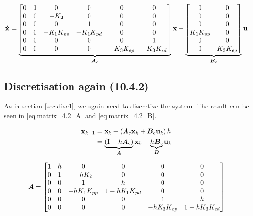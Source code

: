 \begin{equation}\label{eq:matrices}
	\mathbf{\dot{x}} =
	\underbrace{
		\begin{bmatrix}
			0 & 1 & 0				& 0				& 0				& 0				\\
			0 & 0 & -K_{2}			& 0				& 0				& 0				\\
			0 & 0 & 0				& 1				& 0				& 0				\\
			0 & 0 & -K_{1}K_{pp}	& -K_{1}K_{pd}	& 0				& 0				\\
			0 & 0 & 0				& 0 			& 0				& 1				\\
			0 & 0 & 0				& 0				& -K_{3}K_{ep}	& -K_{3}K_{ed}	\\
		\end{bmatrix}
	}_{\bm{A}_{c}}
	\mathbf{x} +
	\underbrace{
		\begin{bmatrix}
			0			& 0				\\
			0			& 0				\\
			0			& 0				\\
			K_{1}K_{pp}	& 0				\\
			0			& 0				\\
			0			& K_{3}K_{ep}	\\
		\end{bmatrix}
	}_{\bm{B}_{c}}
	\mathbf{u}
\end{equation}

\subsection{Discretisation again (10.4.2)}
As in section \ref{sec:disc1}, we again need to discretize the system. The result can be seen in \eqref{eq:matrix_4.2_A} and \eqref{eq:matrix_4.2_B}.

\begin{equation}
\begin{aligned}
	\mathbf{x}_{k+1}	&= \mathbf{x}_{k} + \left( \bm{A}_{c} \mathbf{x}_{k} + \bm{B}_{c} \mathbf{u}_{k} \right) h \\
				&= \underbrace{\left( \mathbf{I} + h \bm{A}_{c} \right)}_{\bm{A}} \mathbf{x}_{k}
				+ \underbrace{h \bm{B}_{c}}_{\bm{B}} \mathbf{u}_{k} \\
\end{aligned}
\end{equation}

\begin{equation}\label{eq:matrix_4.2_A}
	\bm{A} =
	\begin{bmatrix}
		1 & h & 0				& 0					& 0				& 0					\\
		0 & 1 & -hK_{2}			& 0					& 0				& 0					\\
		0 & 0 & 1				& h					& 0				& 0					\\
		0 & 0 & -hK_{1}K_{pp}	& 1-hK_{1}K_{pd}	& 0				& 0					\\
		0 & 0 & 0				& 0					& 1				& h					\\
		0 & 0 & 0				& 0					& -hK_{3}K_{ep}	& 1-hK_{3}K_{ed}	\\
	\end{bmatrix}
\end{equation}

